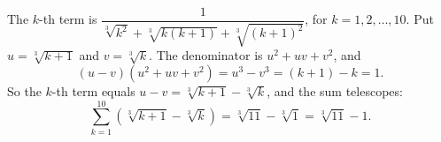 The $k$-th term is $\dfrac{1}{\sqrt[3]{k^2}+\sqrt[3]{k(k+1)}+\sqrt[3]{(k+1)^2}}$, for $k=1,2,\dots,10$. Put $u=\sqrt[3]{k+1}$ and $v=\sqrt[3]{k}$. The denominator is $u^2+uv+v^2$, and
\[
(u-v)(u^2+uv+v^2)=u^3-v^3=(k+1)-k=1 .
\]
So the $k$-th term equals $u-v=\sqrt[3]{k+1}-\sqrt[3]{k}$, and the sum telescopes:
\[
\sum_{k=1}^{10}\left(\sqrt[3]{k+1}-\sqrt[3]{k}\right)=\sqrt[3]{11}-\sqrt[3]{1}=\boxed{\sqrt[3]{11}-1}.
\]
